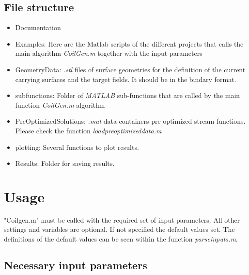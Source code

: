 \documentclass[a4paper,12pt]{book}
\begin{document}
\subsection{File structure}

\begin{itemize}
	\item Documentation\textunderscore 
	\item  Examples: Here are the Matlab scripts of the different projects that calls the main algorithm \textit{CoilGen.m} together with the input parameters
	\item  Geometry\textunderscore Data: \textit{.stl} files of surface geometries for the definition of the current carrying surfaces and the target fields. It should be in the bindary format.
	\item  sub\textunderscore functions: Folder of \textit{MATLAB} sub-functions that are called by the main function \textit{CoilGen.m} algorithm
	\item  Pre\textunderscore Optimized\textunderscore Solutions: \textit{.mat} data containers pre-optimized stream functions. Please check the function \textit{load\textunderscore preoptimized\textunderscore data.m}
	\item  plotting: Several functions to plot results.
	\item  Results: Folder for saving results.
	
\end{itemize}

\section{Usage}
"Coilgen.m" must be called with the required set of input parameters. All other settings and variables are optional. If not specified the default values set. The definitions of the default values can be seen within the function \textit{parse\textunderscore inputs.m}.

\subsection{Necessary input parameters}
\end{document}
